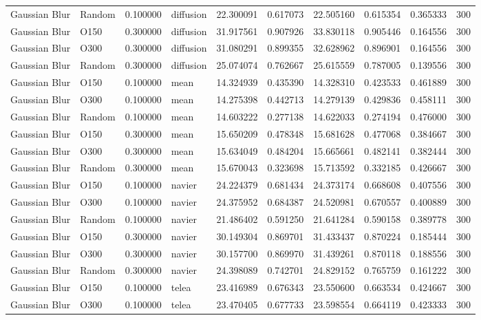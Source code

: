 \begin{table}[h]
\begin{tabular}{llrlrrrrrr}
Gaussian Blur & Random & 0.100000 & diffusion & 22.300091 & 0.617073 & 22.505160 & 0.615354 & 0.365333 & 300 \\
Gaussian Blur & O150 & 0.300000 & diffusion & 31.917561 & 0.907926 & 33.830118 & 0.905446 & 0.164556 & 300 \\
Gaussian Blur & O300 & 0.300000 & diffusion & 31.080291 & 0.899355 & 32.628962 & 0.896901 & 0.164556 & 300 \\
Gaussian Blur & Random & 0.300000 & diffusion & 25.074074 & 0.762667 & 25.615559 & 0.787005 & 0.139556 & 300 \\
Gaussian Blur & O150 & 0.100000 & mean & 14.324939 & 0.435390 & 14.328310 & 0.423533 & 0.461889 & 300 \\
Gaussian Blur & O300 & 0.100000 & mean & 14.275398 & 0.442713 & 14.279139 & 0.429836 & 0.458111 & 300 \\
Gaussian Blur & Random & 0.100000 & mean & 14.603222 & 0.277138 & 14.622033 & 0.274194 & 0.476000 & 300 \\
Gaussian Blur & O150 & 0.300000 & mean & 15.650209 & 0.478348 & 15.681628 & 0.477068 & 0.384667 & 300 \\
Gaussian Blur & O300 & 0.300000 & mean & 15.634049 & 0.484204 & 15.665661 & 0.482141 & 0.382444 & 300 \\
Gaussian Blur & Random & 0.300000 & mean & 15.670043 & 0.323698 & 15.713592 & 0.332185 & 0.426667 & 300 \\
Gaussian Blur & O150 & 0.100000 & navier & 24.224379 & 0.681434 & 24.373174 & 0.668608 & 0.407556 & 300 \\
Gaussian Blur & O300 & 0.100000 & navier & 24.375952 & 0.684387 & 24.520981 & 0.670557 & 0.400889 & 300 \\
Gaussian Blur & Random & 0.100000 & navier & 21.486402 & 0.591250 & 21.641284 & 0.590158 & 0.389778 & 300 \\
Gaussian Blur & O150 & 0.300000 & navier & 30.149304 & 0.869701 & 31.433437 & 0.870224 & 0.185444 & 300 \\
Gaussian Blur & O300 & 0.300000 & navier & 30.157700 & 0.869970 & 31.439261 & 0.870118 & 0.188556 & 300 \\
Gaussian Blur & Random & 0.300000 & navier & 24.398089 & 0.742701 & 24.829152 & 0.765759 & 0.161222 & 300 \\
Gaussian Blur & O150 & 0.100000 & telea & 23.416989 & 0.676343 & 23.550600 & 0.663534 & 0.424667 & 300 \\
Gaussian Blur & O300 & 0.100000 & telea & 23.470405 & 0.677733 & 23.598554 & 0.664119 & 0.423333 & 300 \\

\end{tabular}
\end{table}
